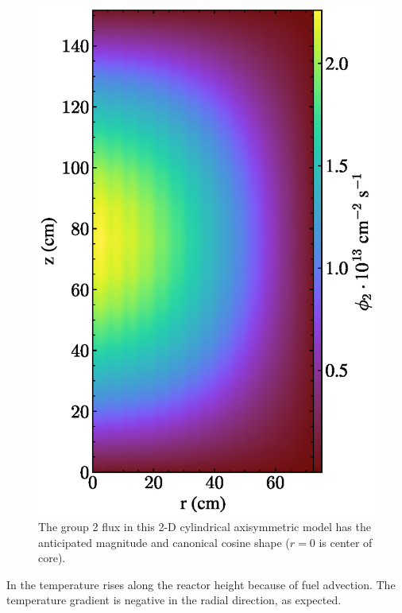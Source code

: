 \documentclass{article}
\begin{document}
\begin{figure}[htpb]
  \centering
  \includegraphics{2d_gamma_heating_group2.eps}
        \caption{The group 2 flux in this 2-D cylindrical axisymmetric model
        has the anticipated magnitude and canonical cosine shape ($r=0$ is center of core). }
  \label{fig:group2}
\end{figure}

In  the temperature rises along the reactor height because of 
fuel advection. The temperature gradient is negative in the 
radial direction, as expected.
\end{document}
